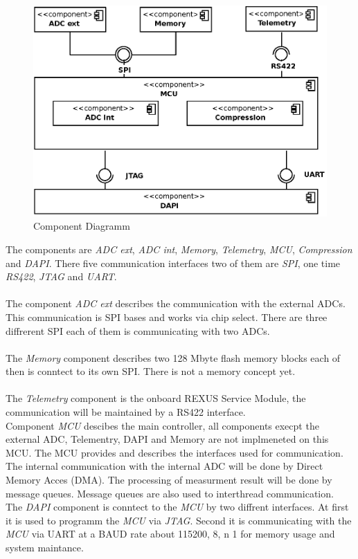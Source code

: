 \begin{figure}[H]
	\centering
	\includegraphics{SoftwareDesign/Components.eps}
	\caption{Component Diagramm}
\end{figure} \noindent
The components are \textit{ADC ext}, \textit{ADC int}, \textit{Memory}, \textit{Telemetry}, \textit{MCU}, \textit{Compression} and \textit{DAPI}. There five communication interfaces two of them are \textit{SPI}, one time \textit{RS422}, \textit{JTAG} and \textit{UART}.\\ \\
The component \textit{ADC ext} describes the communication with the external ADCs. This communication is SPI bases and works via chip select. There are three diffrerent SPI each of them is communicating with two ADCs. \\ \\
The \textit{Memory} component  describes two 128 Mbyte flash memory blocks each of then  is conntect to its own SPI. There is not a memory concept yet. \\ \\
The \textit{Telemetry} component is the onboard REXUS Service Module, the communication will be maintained by a RS422 interface. \\ 
Component \textit{MCU} descibes the main controller, all components execpt the external ADC, Telementry, DAPI and Memory are not implmeneted on this MCU. The MCU provides and describes the interfaces used for communication. The internal communication with the internal ADC will be done by Direct Memory Acces (DMA). The processing of measurment result will be done by message queues. Message queues are also used to interthread communication. \\ 
The \textit{DAPI} component is conntect to the \textit{MCU} by two diffrent interfaces. At first it is used to programm the \textit{MCU} via \textit{JTAG}. Second it is communicating with the \textit{MCU} via UART at a BAUD rate about 115200, 8, n 1 for memory usage and system maintance. 